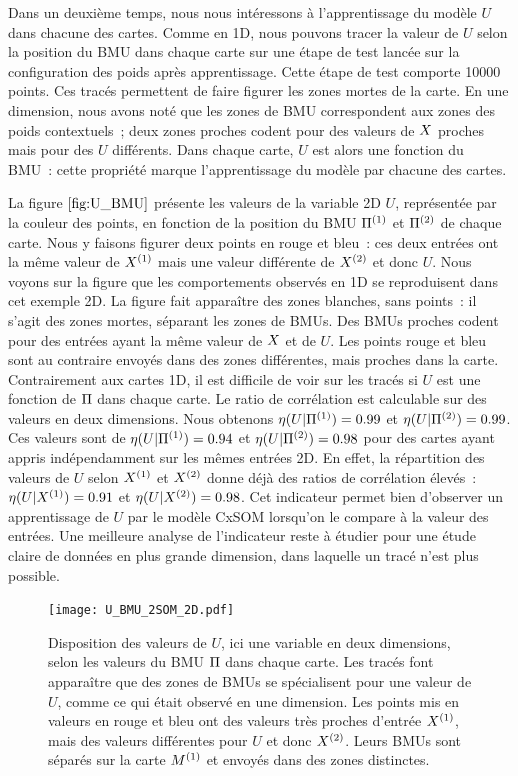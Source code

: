 \documentclass[../main]{subfiles}
\begin{document}
Dans un deuxième temps, nous nous intéressons à l'apprentissage du modèle $U$ dans chacune des cartes. Comme en 1D, nous pouvons tracer la valeur de $U$ selon la position du BMU dans chaque carte sur une étape de test lancée sur la configuration des poids après apprentissage. Cette étape de test comporte 10000 points.
Ces tracés permettent de faire figurer les zones mortes de la carte. En une dimension, nous avons noté que les zones de BMU correspondent aux zones des poids contextuels~; deux zones proches codent pour des valeurs de $X$ proches mais pour des $U$ différents. Dans chaque carte, $U$ est alors une fonction du BMU~: cette propriété marque l'apprentissage du modèle par chacune des cartes. 

La figure $\ref{fig:U_BMU}$ présente les valeurs de la variable 2D $U$, représentée par la couleur des points, en fonction de la position du BMU $\Pi^{({1})}$ et $\Pi^{({2})}$ de chaque carte. Nous y faisons figurer deux points en rouge et bleu~: ces deux entrées ont la même valeur de $X^{({1})}$ mais une valeur différente de $X^{({2})}$ et donc $U$.
Nous voyons sur la figure que les comportements observés en 1D se reproduisent dans cet exemple 2D. La figure fait apparaître des zones blanches, sans points~: il s'agit des zones mortes, séparant les zones de BMUs. Des BMUs proches codent pour des entrées ayant la même valeur de $X$ et de $U$. Les points rouge et bleu sont au contraire envoyés dans des zones différentes, mais proches dans la carte.
Contrairement aux cartes 1D, il est difficile de voir sur les tracés si $U$ est une fonction de $\Pi$ dans chaque carte. Le ratio de corrélation est calculable sur des valeurs en deux dimensions.
Nous obtenons $\eta(U|\Pi^{({1})}) = 0.99 $ et $\eta(U|\Pi^{({2})}) = 0.99 $.
Ces valeurs sont de $\eta(U|\Pi^{({1})}) = 0.94 $ et $\eta(U|\Pi^{({2})}) = 0.98$ pour des cartes ayant appris indépendamment sur les mêmes entrées 2D.
En effet, la répartition des valeurs de $U$ selon $X^{({1})}$ et $X^{({2})}$ donne déjà des ratios de corrélation élevés~:
$\eta(U|X^{({1})}) = 0.91$ et $\eta(U|X^{({2})}) = 0.98$. 
Cet indicateur permet bien d'observer un apprentissage de $U$ par le modèle CxSOM lorsqu'on le compare à la valeur des entrées. Une meilleure analyse de l'indicateur reste à étudier pour une étude claire de données en plus grande dimension, dans laquelle un tracé n'est plus possible.

\begin{figure}
	\texttt{[image: U\_BMU\_2SOM\_2D.pdf]}
	\caption{Disposition des valeurs de $U$, ici une variable en deux dimensions, selon les valeurs du BMU $\Pi$ dans chaque carte. Les tracés font apparaître que des zones de BMUs se spécialisent pour une valeur de $U$, comme ce qui était observé en une dimension. Les points mis en valeurs en rouge et bleu ont des valeurs très proches d'entrée $X^{({1})}$, mais des valeurs différentes pour $U$ et donc $X^{({2})}$. Leurs BMUs sont séparés sur la carte $M^{({1})}$ et envoyés dans des zones distinctes.
	\label{fig:U_BMU}}
\end{figure}
\end{document}
